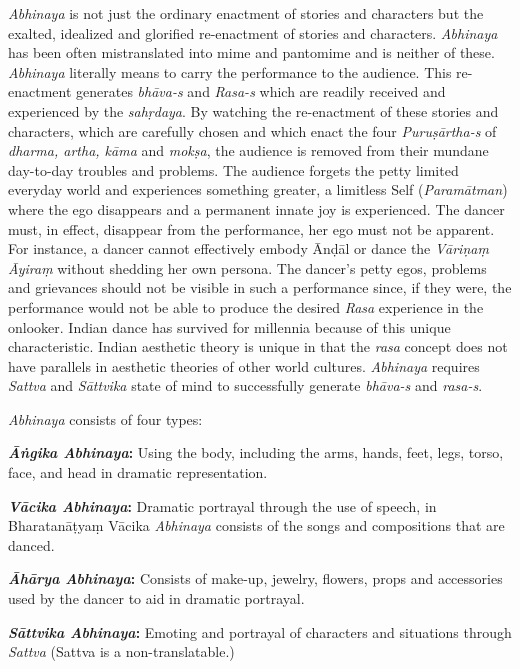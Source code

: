 \textit{Abhinaya} is not just the ordinary enactment of stories and characters but the exalted, idealized and glorified re-enactment of stories and characters. \textit{Abhinaya} has been often mistranslated into mime and pantomime and is neither of these. \textit{Abhinaya} literally means to carry the performance to the audience. This re-enactment generates \textit{bhāva-s} and \textit{Rasa-s} which are readily received and experienced by the \textit{sahṛdaya}. By watching the re-enactment of these stories and characters, which are carefully chosen and which enact the four \textit{Puruṣārtha-s} of \textit{dharma, artha, kāma} and \textit{mokṣa}, the audience is removed from their mundane day-to-day troubles and problems. The audience forgets the petty limited everyday world and experiences something greater, a limitless Self (\textit{Paramātman}) where the ego disappears and a permanent innate joy is experienced. The dancer must, in effect, disappear from the performance, her ego must not be apparent. For instance, a dancer cannot effectively embody Ānḍāl or dance the \textit{Vāriṇaṃ Āyiraṃ }without shedding her own persona. The dancer’s petty egos, problems and grievances should not be visible in such a performance since, if they were, the performance would not be able to produce the desired \textit{Rasa} experience in the onlooker. Indian dance has survived for millennia because of this unique characteristic. Indian aesthetic theory is unique in that the \textit{rasa} concept does not have parallels in aesthetic theories of other world cultures. \textit{Abhinaya} requires \textit{Sattva} and \textit{Sāttvika} state of mind to successfully generate \textit{bhāva-s} and \textit{rasa-s}.

\textit{Abhinaya} consists of four types:

\textbf{\textit{Āṅgika Abhinaya}:} Using the body, including the arms, hands, feet, legs, torso, face, and head in dramatic representation.

\textbf{\textit{Vācika Abhinaya}:} Dramatic portrayal through the use of speech, in Bharatanāṭyaṃ Vācika \textit{Abhinaya} consists of the songs and compositions that are danced.

\textbf{\textit{Āhārya Abhinaya}:} Consists of make-up, jewelry, flowers, props and accessories used by the dancer to aid in dramatic portrayal.

\textbf{\textit{Sāttvika Abhinaya}:} Emoting and portrayal of characters and situations through \textit{Sattva} (Sattva is a non-translatable.)

